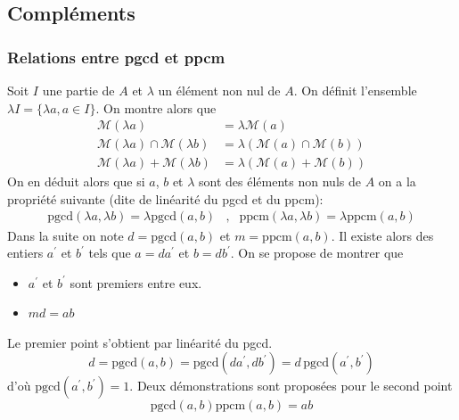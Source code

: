 \subsection{Compléments}
\subsubsection{Relations entre pgcd et ppcm}
Soit $I$ une partie de $A$ et $\lambda$ un élément non nul de $A$. On définit l'ensemble $\lambda I = \{\lambda a , a\in I\}$. On montre alors que 
\begin{align*}
 \mathcal M (\lambda a) &= \lambda \mathcal M ( a) \\
\mathcal M (\lambda a)\cap  \mathcal M (\lambda b) &= \lambda \left( \mathcal M ( a) \cap  \mathcal M (b)\right) \\
\mathcal M (\lambda a) + \mathcal M (\lambda b) &= \lambda \left( \mathcal M ( a) +  \mathcal M (b)\right)
\end{align*}
On en déduit alors que si $a$, $b$ et $\lambda$ sont des éléments non nuls de $A$ on a la propriété suivante (dite de linéarité du pgcd et du ppcm):
\begin{align*}
 \text{pgcd}(\lambda a, \lambda b)=\lambda \text{pgcd}(a, b) &,& \text{ppcm}(\lambda a, \lambda b)=\lambda \text{ppcm}(a, b)
\end{align*}
Dans la suite on note $d=\text{pgcd}(a,b)$ et $m=\text{ppcm}(a, b)$. Il existe alors des entiers $a^\prime$ et $b^\prime$ tels que $a=da^\prime$ et $b=db^\prime$. On se propose de montrer que
\begin{itemize}
 \item $a^\prime$ et $b^\prime$ sont premiers entre eux.
\item $md=ab$
\end{itemize}
Le premier point s'obtient par linéarité du pgcd.
\begin{displaymath}
 d=\text{pgcd}(a,b)=\text{pgcd}(da^\prime,db^\prime)=d\,\text{pgcd}(a^\prime,b^\prime)
\end{displaymath}
d'où $\text{pgcd}(a^\prime,b^\prime)=1$.\newline
Deux démonstrations sont proposées pour le second point 
\begin{displaymath}
 \text{pgcd}(a,b)\text{ppcm}(a,b)=ab
\end{displaymath}

